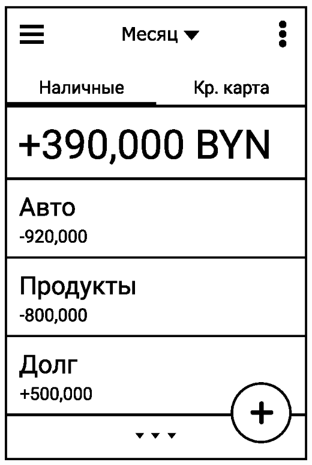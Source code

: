 \documentclass[russian,utf8,a1paper,nostitching,simple]{eskdgraph}
\begin{document}
\begin{ESKDdrawing}
\begin{minipage}{28cm}
\begin{minipage}{7.5cm}
      \vspace{2cm}
      \centering
      \includegraphics[width=\linewidth]{fig/ui_activities_balance_text_group.eps}
    \end{minipage}
    \hfill
    \begin{minipage}{7.5cm}
      \centering
      \vspace{1cm}


\end{minipage}
\end{minipage}
\end{ESKDdrawing}
\end{document}

